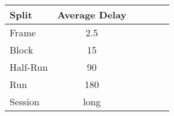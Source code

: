 \begin{tabular}{l*{5}{c}}
\toprule
Split	& Average Delay \\
\midrule
Frame & 2.5 \\
Block & 15 \\
Half-Run & 90 \\
Run & 180 \\
Session & long\\
\bottomrule 
\end{tabular}
